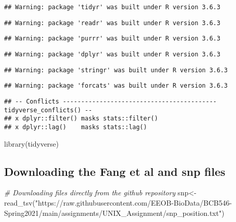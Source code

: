 \documentclass[
]{article}
\newenvironment{Shaded}{\begin{snugshade}}{\end{snugshade}}
\newcommand{\CommentTok}[1]{\textcolor[rgb]{0.56,0.35,0.01}{\textit{#1}}}
\newcommand{\FunctionTok}[1]{\textcolor[rgb]{0.00,0.00,0.00}{#1}}
\newcommand{\NormalTok}[1]{#1}
\newcommand{\OtherTok}[1]{\textcolor[rgb]{0.56,0.35,0.01}{#1}}
\newcommand{\StringTok}[1]{\textcolor[rgb]{0.31,0.60,0.02}{#1}}
\begin{document}
\begin{verbatim}
## Warning: package 'tidyr' was built under R version 3.6.3
\end{verbatim}

\begin{verbatim}
## Warning: package 'readr' was built under R version 3.6.3
\end{verbatim}

\begin{verbatim}
## Warning: package 'purrr' was built under R version 3.6.3
\end{verbatim}

\begin{verbatim}
## Warning: package 'dplyr' was built under R version 3.6.3
\end{verbatim}

\begin{verbatim}
## Warning: package 'stringr' was built under R version 3.6.3
\end{verbatim}

\begin{verbatim}
## Warning: package 'forcats' was built under R version 3.6.3
\end{verbatim}

\begin{verbatim}
## -- Conflicts ------------------------------------------ tidyverse_conflicts() --
## x dplyr::filter() masks stats::filter()
## x dplyr::lag()    masks stats::lag()
\end{verbatim}

\begin{Shaded}
\begin{Highlighting}[]
\FunctionTok{library}\NormalTok{(tidyverse)}
\end{Highlighting}
\end{Shaded}

\hypertarget{downloading-the-fang-et-al-and-snp-files}{%
\subsection{Downloading the Fang et al and snp
files}\label{downloading-the-fang-et-al-and-snp-files}}

\begin{Shaded}
\begin{Highlighting}[]
\CommentTok{\# Downloading files directly from the github repository }
\NormalTok{snp}\OtherTok{\textless{}{-}}\FunctionTok{read\_tsv}\NormalTok{(}\StringTok{"https://raw.githubusercontent.com/EEOB{-}BioData/BCB546{-}Spring2021/main/assignments/UNIX\_Assignment/snp\_position.txt"}\NormalTok{)}
\end{Highlighting}
\end{Shaded}
\end{document}
